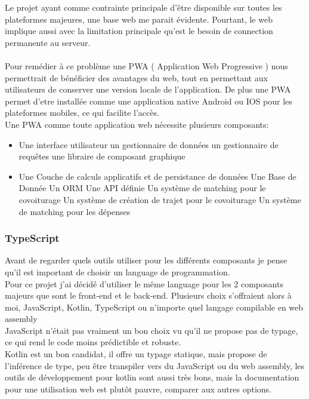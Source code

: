 
Le projet ayant comme contrainte principale d'être disponible sur toutes les plateformes majeures, une base web me parait évidente.
Pourtant, le web implique aussi avec la limitation principale qu'est le besoin de connection permanente au serveur.\\\\
Pour remédier à ce problème une PWA ( Application Web Progressive ) nous permettrait de bénéficier des avantages du web,
tout en permettant aux utilisateurs de conserver une version locale de l'application.
De plus une PWA permet d'etre installée comme une application native Android ou IOS pour les plateformes mobiles, ce qui facilite l'accès.\\

Une PWA comme toute application web nécessite plusieurs composants:
\begin{itemize}
    \item Une interface utilisateur
    \subitem un gestionnaire de données
    \subitem un gestionnaire de requêtes
    \subitem une libraire de composant graphique
    \item Une Couche de calculs applicatifs et de persistance de données
    \subitem Une Base de Donnée
    \subitem Un ORM
    \subitem Une API définie
    \subitem Un système de matching pour le covoiturage
    \subitem Un système de création de trajet pour le covoiturage
    \subitem Un système de matching pour les dépenses
\end{itemize}

\subsubsection{TypeScript}
Avant de regarder quels outils utiliser pour les différents composants je pense qu'il est important de choisir un language de programmation.\\

Pour ce projet j'ai décidé d'utiliser le même language pour les 2 composants majeurs que sont le front-end et le back-end.
Plusieurs choix s'offraient alors à moi, JavaScript, Kotlin, TypeScript ou n'importe quel langage compilable en web assembly\\

JavaScript n'était pas vraiment un bon choix vu qu'il ne propose pas de typage, ce qui rend le code moins prédictible et robuste.\\

Kotlin est un bon candidat, il offre un typage statique, mais propose de l'inférence de type, peu être transpiler vers du JavaScript ou du web assembly,
les outils de développement pour kotlin sont aussi très bons, mais la documentation pour une utilisation web est plutôt pauvre, comparer aux autres options.\\\\

